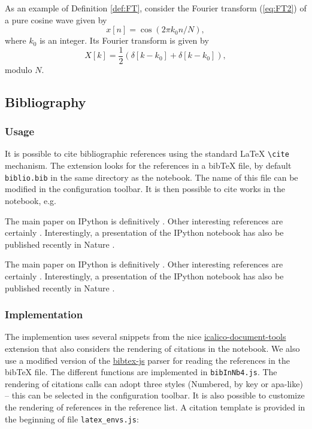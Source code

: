     As an example of Definition \ref{def:FT}, consider the Fourier transform
(\ref{eq:FT2}) of a pure cosine wave given by \[
x[n]= \cos(2\pi k_0 n/N),
\] where \(k_0\) is an integer. Its Fourier transform is given by \[
X[k] = \frac{1}{2} \left( \delta[k-k_0] + \delta[k-k_0] \right), 
\] modulo \(N\).

    \subsection{Bibliography}\label{bibliography}

    \subsubsection{Usage}\label{usage}

    It is possible to cite bibliographic references using the standard LaTeX
\texttt{\textbackslash{}cite} mechanism. The extension looks for the
references in a bibTeX file, by default \texttt{biblio.bib} in the same
directory as the notebook. The name of this file can be modified in the
configuration toolbar. It is then possible to cite works in the
notebook, e.g.

\begin{listing}
The main paper on IPython is definitively \cite{PER-GRA:2007}. Other interesting references are certainly \cite{mckinney2012python, rossant2013learning}. Interestingly, a presentation of the IPython notebook has also be published recently in Nature \cite{shen2014interactive}.
\end{listing}

The main paper on IPython is definitively \cite{PER-GRA:2007}. Other
interesting references are certainly
\cite{mckinney2012python, rossant2013learning}. Interestingly, a
presentation of the IPython notebook has also be published recently in
Nature \cite{shen2014interactive}.

    \subsubsection{Implementation}\label{implementation}

    The implemention uses several snippets from the nice
\href{https://bitbucket.org/ipre/calico/downloads/}{icalico-document-tools}
extension that also considers the rendering of citations in the
notebook. We also use a modified version of the
\href{https://code.google.com/p/bibtex-js/}{bibtex-js} parser for
reading the references in the bibTeX file. The different functions are
implemented in \texttt{bibInNb4.js}. The rendering of citations calls
can adopt three styles (Numbered, by key or apa-like) -- this can be
selected in the configuration toolbar. It is also possible to customize
the rendering of references in the reference list. A citation template
is provided in the beginning of file \texttt{latex\_envs.js}:

